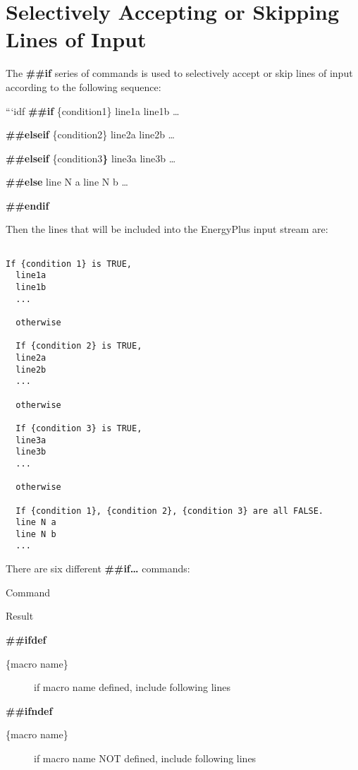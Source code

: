 \section{Selectively Accepting or Skipping Lines of Input}\label{selectively-accepting-or-skipping-lines-of-input}

The \textbf{\#\#if} series of commands is used to selectively accept or skip lines of input according to the following sequence:

```idf \textbf{\#\#if} \{condition1\} line1a line1b \ldots{}

\textbf{\#\#elseif} \{condition2\} line2a line2b \ldots{}

\textbf{\#\#elseif} \{condition3\textbf{\}} line3a line3b \ldots{}

\textbf{\#\#else} line N a line N b \ldots{}

\textbf{\#\#endif}

Then the lines that will be included into the EnergyPlus input stream are:

\begin{lstlisting}

If {condition 1} is TRUE,
  line1a
  line1b
  ...

  otherwise

  If {condition 2} is TRUE,
  line2a
  line2b
  ...

  otherwise

  If {condition 3} is TRUE,
  line3a
  line3b
  ...

  otherwise

  If {condition 1}, {condition 2}, {condition 3} are all FALSE.
  line N a
  line N b
  ...
\end{lstlisting}

There are six different \textbf{\#\#if\ldots{}} commands:

Command

Result

\textbf{\#\#ifdef}

\begin{description}
\item[\{macro name\}]
if macro name defined, include following lines
\end{description}

\textbf{\#\#ifndef}

\begin{description}
\item[\{macro name\}]
if macro name NOT defined, include following lines
\end{description}

